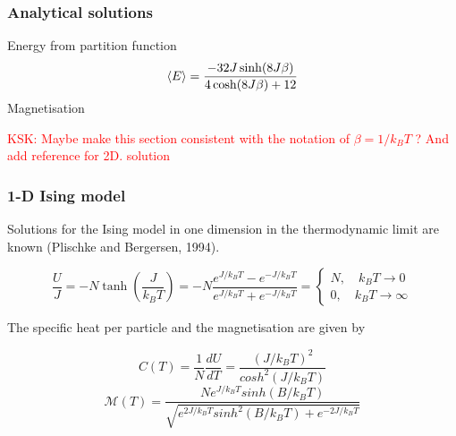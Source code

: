 \documentclass[11pt,a4paper,english]{article}
\numberwithin{equation}{section}
\newcommand{\magM}{\mathcal{M}}
\begin{document}



\subsubsection{Analytical solutions}

Energy from partition function
\begin{gather}
\expval{E} = \frac{-32J\sinh(8J\beta)}{4\cosh(8J\beta)+12}
\end{gather}
Magnetisation

\textcolor{red}{KSK: Maybe make this section consistent with the notation of $\beta = 1/ k_B T$ ? And add reference for 2D. solution}

\subsubsection{1-D Ising model}
Solutions for the Ising model in one dimension in the 
thermodynamic limit are known (Plischke and Bergersen, 1994). 

\begin{equation}
\frac{U}{J} = -N \tanh \left( \frac{J}{k_B T} \right) = -N \frac{e^{J/k_B T}-e^{-J/k_B T} }{e^{J/k_B T}+ e^{-J/k_B T} } =  \begin{cases} N, \quad k_B T \to 0 \\ 0, \quad  k_B T \to \infty \end{cases}
\end{equation}

The specific heat per particle and the magnetisation are given by 

\begin{equation}
C(T) = \frac{1}{N} \frac{dU}{dT} = \frac{(J/k_B T)^2}{cosh^2 (J/k_B T)}
\end{equation}
\begin{equation}
\magM(T) = \frac{N e^{J / k_B T} sinh(B/k_B T) }{ \sqrt{ e^{2J/k_B T} sinh^2 (B/k_B T) + e^{-2J/ k_B T}  } }
\end{equation}
\end{document}
